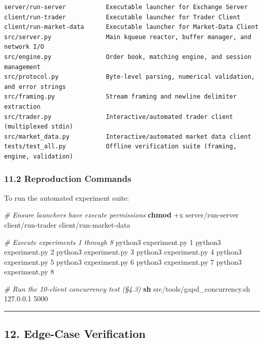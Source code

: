 \documentclass[
]{article}
\newenvironment{Shaded}{\begin{snugshade}}{\end{snugshade}}
\newcommand{\CommentTok}[1]{\textcolor[rgb]{0.56,0.35,0.01}{\textit{#1}}}
\newcommand{\ExtensionTok}[1]{#1}
\newcommand{\FunctionTok}[1]{\textcolor[rgb]{0.13,0.29,0.53}{\textbf{#1}}}
\newcommand{\NormalTok}[1]{#1}
\begin{document}
\begin{verbatim}
server/run-server           Executable launcher for Exchange Server
client/run-trader           Executable launcher for Trader Client
client/run-market-data      Executable launcher for Market-Data Client
src/server.py               Main kqueue reactor, buffer manager, and network I/O
src/engine.py               Order book, matching engine, and session management
src/protocol.py             Byte-level parsing, numerical validation, and error strings
src/framing.py              Stream framing and newline delimiter extraction
src/trader.py               Interactive/automated trader client (multiplexed stdin)
src/market_data.py          Interactive/automated market data client
tests/test_all.py           Offline verification suite (framing, engine, validation)
\end{verbatim}

\hypertarget{reproduction-commands}{%
\subsubsection{11.2 Reproduction Commands}\label{reproduction-commands}}

To run the automated experiment suite:

\begin{Shaded}
\begin{Highlighting}[]
\CommentTok{\# Ensure launchers have execute permissions}
\FunctionTok{chmod}\NormalTok{ +x server/run{-}server client/run{-}trader client/run{-}market{-}data}

\CommentTok{\# Execute experiments 1 through 8}
\ExtensionTok{python3}\NormalTok{ experiment.py 1}
\ExtensionTok{python3}\NormalTok{ experiment.py 2}
\ExtensionTok{python3}\NormalTok{ experiment.py 3}
\ExtensionTok{python3}\NormalTok{ experiment.py 4}
\ExtensionTok{python3}\NormalTok{ experiment.py 5}
\ExtensionTok{python3}\NormalTok{ experiment.py 6}
\ExtensionTok{python3}\NormalTok{ experiment.py 7}
\ExtensionTok{python3}\NormalTok{ experiment.py 8}

\CommentTok{\# Run the 10{-}client concurrency test (§4.3)}
\FunctionTok{sh}\NormalTok{ src/tools/gapd\_concurrency.sh 127.0.0.1 5000}
\end{Highlighting}
\end{Shaded}

\begin{center}\rule{0.5\linewidth}{0.5pt}\end{center}

\hypertarget{edge-case-verification}{%
\subsection{12. Edge-Case Verification}\label{edge-case-verification}}
\end{document}
